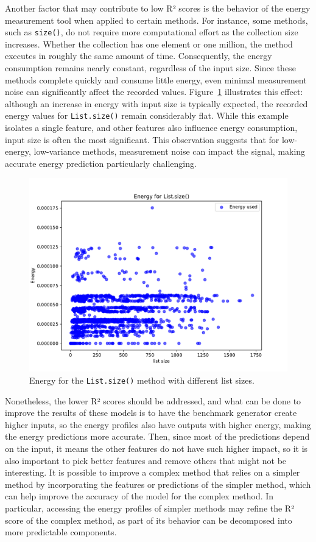 Another factor that may contribute to low R² scores is the behavior of the energy measurement tool when applied to certain methods. For instance, some methods, such as \texttt{size()}, do not require more computational effort as the collection size increases. Whether the collection has one element or one million, the method executes in roughly the same amount of time. Consequently, the energy consumption remains nearly constant, regardless of the input size. Since these methods complete quickly and consume little energy, even minimal measurement noise can significantly affect the recorded values. Figure~\ref{fig:size_energy} illustrates this effect: although an increase in energy with input size is typically expected, the recorded energy values for \texttt{List.size()} remain considerably flat. While this example isolates a single feature, and other features also influence energy consumption, input size is often the most significant. This observation suggests that for low-energy, low-variance methods, measurement noise can impact the signal, making accurate energy prediction particularly challenging.

\begin{figure}[htbp]
  \centering
  \includegraphics[width = .8 \textwidth]{figures/size_energy.pdf}
  \caption{Energy for the \texttt{List.size()} method with different list sizes.}
  \label{fig:size_energy}
\end{figure}


Nonetheless, the lower R² scores should be addressed, and what can be done to improve the results of these models is to have the benchmark generator create higher inputs, so the energy profiles also have outputs with higher energy, making the energy predictions more accurate. Then, since most of the predictions depend on the input, it means the other features do not have such higher impact, so it is also important to pick better features and remove others that might not be interesting. It is possible to improve a complex method that relies on a simpler method by incorporating the features or predictions of the simpler method, which can help improve the accuracy of the model for the complex method. In particular, accessing the energy profiles of simpler methods may refine the R² score of the complex method, as part of its behavior can be decomposed into more predictable components.



